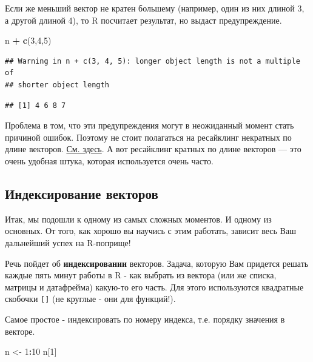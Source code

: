 \documentclass[]{book}
\newenvironment{Shaded}{\begin{snugshade}}{\end{snugshade}}
\newcommand{\DecValTok}[1]{\textcolor[rgb]{0.00,0.00,0.81}{#1}}
\newcommand{\KeywordTok}[1]{\textcolor[rgb]{0.13,0.29,0.53}{\textbf{#1}}}
\newcommand{\NormalTok}[1]{#1}
\newcommand{\OperatorTok}[1]{\textcolor[rgb]{0.81,0.36,0.00}{\textbf{#1}}}
\newcommand{\StringTok}[1]{\textcolor[rgb]{0.31,0.60,0.02}{#1}}
\begin{document}
Если же меньший вектор не кратен большему (например, один из них длиной 3, а другой длиной 4), то R посчитает результат, но выдаст предупреждение.

\begin{Shaded}
\begin{Highlighting}[]
\NormalTok{n }\OperatorTok{+}\StringTok{ }\KeywordTok{c}\NormalTok{(}\DecValTok{3}\NormalTok{,}\DecValTok{4}\NormalTok{,}\DecValTok{5}\NormalTok{)}
\end{Highlighting}
\end{Shaded}

\begin{verbatim}
## Warning in n + c(3, 4, 5): longer object length is not a multiple of
## shorter object length
\end{verbatim}

\begin{verbatim}
## [1] 4 6 8 7
\end{verbatim}

Проблема в том, что эти предупреждения могут в неожиданный момент стать причиной ошибок. Поэтому не стоит полагаться на ресайклинг некратных по длине векторов. \href{https://stackoverflow.com/questions/6555651/under-what-circumstances-does-r-recycle}{См. здесь}. А вот ресайклинг кратных по длине векторов --- это очень удобная штука, которая используется очень часто.

\hypertarget{index_atomic}{%
\subsection{Индексирование векторов}\label{index_atomic}}

Итак, мы подошли к одному из самых сложных моментов. И одному из основных. От того, как хорошо вы научись с этим работать, зависит весь Ваш дальнейший успех на R-поприще!

Речь пойдет об \textbf{индексировании} векторов. Задача, которую Вам придется решать каждые пять минут работы в R - как выбрать из вектора (или же списка, матрицы и датафрейма) какую-то его часть. Для этого используются квадратные скобочки \texttt{{[}{]}} (не круглые - они для функций!).

Самое простое - индексировать по номеру индекса, т.е. порядку значения в векторе.

\begin{Shaded}
\begin{Highlighting}[]
\NormalTok{n <-}\StringTok{ }\DecValTok{1}\OperatorTok{:}\DecValTok{10}
\NormalTok{n[}\DecValTok{1}\NormalTok{]}
\end{Highlighting}
\end{Shaded}
\end{document}
